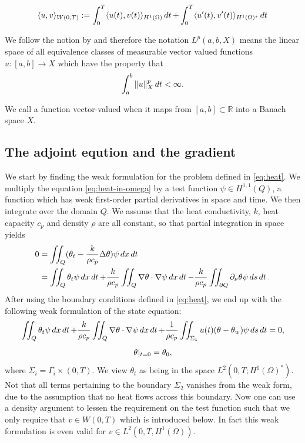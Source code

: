 \begin{equation*}
    \langle u, v \rangle_{W(0,T)} := \int_{0}^T\langle u(t),v(t) \rangle _{H^{1}(\Omega)}\mathop{dt}  +  \int_{0}^T \langle u'(t), v'(t) \rangle_{H^{1}(\Omega)^{*}}\mathop{dt} 
\end{equation*}

We follow the notion by \cite{optimalControl} and therefore the notation $L^{p}(a,b,X)$ means the linear space of all equivalence classes of measurable vector valued functions $u:[a,b] \rightarrow X$ which have the property that
\begin{equation*}
    \int_{a}^b\|u\|_X^p \mathop{dt}<\infty.
\end{equation*}

We call a function vector-valued when it maps from $[a,b] \subset \mathbb{R}$ into a Banach space $X$. 

\subsection{The adjoint eqution and the gradient}
We start by finding the weak formulation for the problem defined in \eqref{eq:heat}. We multiply the equation \eqref{eq:heat-in-omega} by a test function $\psi\in H^{1,1}(Q)$, a function which has weak first-order partial derivatives in space and time. We then integrate over the domain $Q$. We assume that the heat conductivity, $k$, heat capacity $c_p$ and density $\rho$ are all constant, so that partial integration in space yields 
\begin{equation}
\begin{aligned}
  0 &= \iint_Q (\theta_t - \frac{k}{\rho c_p}\Delta\theta)\psi\mathop{dx}\mathop{dt}  \\
  &= \iint_Q \theta_t\psi\mathop{dx}\mathop{dt} + \frac{k}{\rho c_p}\iint_Q\nabla\theta \cdot \nabla\psi\mathop{dx}\mathop{dt} - \frac{k}{\rho c_p}\iint_{\partial Q}\partial_\nu\theta\psi\mathop{ds}\mathop{dt}.
\end{aligned}
\end{equation}
After using the boundary conditions defined in \eqref{eq:heat}, we end up with the following weak formulation of the state equation:
\begin{equation}\label{eq:weak-form}
  \begin{gathered}
  \iint_Q \theta_t\psi\mathop{dx}\mathop{dt} + \frac{k}{\rho c_p}\iint_Q\nabla\theta \cdot \nabla\psi\mathop{dx}\mathop{dt} + \frac{1}{\rho c_p}\iint_{\Sigma_1} u(t)(\theta - \theta_w)\psi\mathop{ds}\mathop{dt} = 0,\\[1ex]
  \theta|_{t=0} = \theta_0,
  \end{gathered}
\end{equation}
where $\Sigma_i = \Gamma_i\times(0,T)$. We view $\theta_t$ as being in the space $ L^2(0,T;H^1(\Omega)^{*})$. Not that all terms pertaining to the boundary $\Sigma_2$ vanishes from the weak form, due to the assumption that no heat flows across this boundary. Now one can use a density argument to lessen the requirement on the test function such that we only require that $v \in W(0,T)$ which is introduced below. In fact this weak formulation is even valid for $v \in L^2(0,T,H^1(\Omega))$. 

